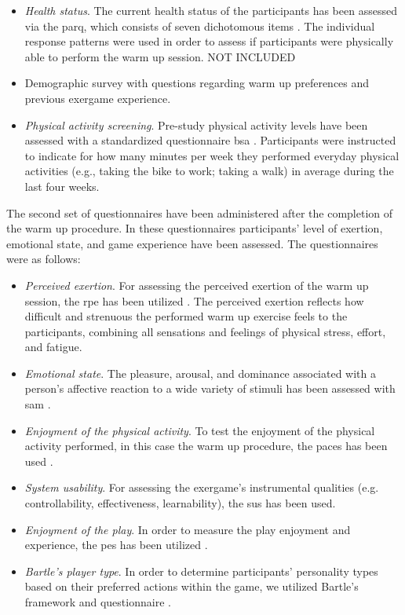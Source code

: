 \begin{itemize}
\item \textit{Health status}. The current health status of the participants has been assessed via the \gls{parq}, which consists of seven dichotomous items \cite{thomas1992revision}. The individual response patterns were used in order to assess if participants were physically able to perform the warm up session. NOT INCLUDED
\item Demographic survey with questions regarding warm up preferences and previous exergame experience.
\item \textit{Physical activity screening}. Pre-study physical activity levels have been assessed with a standardized questionnaire  \gls{bsa} \cite{fuchs2015messung}. Participants were instructed to indicate for how many minutes per week they performed everyday physical activities (e.g., taking the bike to work; taking a walk) in average during the last four weeks. 
\end{itemize}
The second set of questionnaires have been administered after the completion of the warm up procedure. In these questionnaires participants' level of exertion, emotional state, and game experience have been assessed. The questionnaires were as follows:
\begin{itemize}
\item \textit{Perceived exertion}. For assessing the perceived exertion of the warm up session, the \gls{rpe} has been utilized \cite{borg1998borg}. The perceived exertion reflects how difficult and strenuous the performed warm up exercise feels to the participants, combining all sensations and feelings of physical stress, effort, and fatigue.
\item \textit{Emotional state}. The pleasure, arousal, and dominance associated with a person's affective reaction to a wide variety of stimuli has been assessed with \gls{sam} \cite{bradley1994measuring}. 
\item \textit{Enjoyment of the physical activity}. To test the enjoyment of the physical activity performed, in this case the warm up procedure, the \gls{paces} has been used \cite{kendzierski1991physical}. 
\item \textit{System usability}. For assessing the exergame's instrumental qualities (e.g. controllability, effectiveness, learnability), the \gls{sus} has been used.
\item \textit{Enjoyment of the play}. In order to measure the play enjoyment and experience, the \gls{pes} has been utilized  \cite{pavlas2012play}.
\item \textit{Bartle's player type}. In order to determine participants’ personality types based on their preferred actions within the game, we utilized Bartle's framework and questionnaire \cite{bartle}.
\end{itemize}
